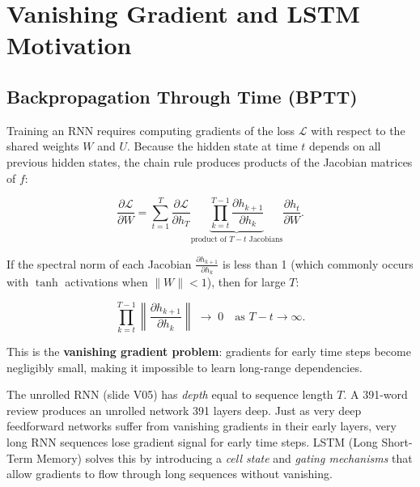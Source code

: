 \documentclass[12pt,a4paper]{article}
\begin{document}
\section{Vanishing Gradient and LSTM Motivation}
\label{sec:lstm_motivation}

\subsection{Backpropagation Through Time (BPTT)}
\label{subsec:bptt}

Training an RNN requires computing gradients of the loss
$\mathcal{L}$ with respect to the shared weights $W$ and $U$.
Because the hidden state at time $t$ depends on all previous hidden
states, the chain rule produces products of the Jacobian matrices of
$f$:

\begin{equation}
  \frac{\partial \mathcal{L}}{\partial W}
    = \sum_{t=1}^{T} \frac{\partial \mathcal{L}}{\partial h_T}
      \underbrace{\prod_{k=t}^{T-1}
        \frac{\partial h_{k+1}}{\partial h_k}}_{\text{product of }T-t\text{ Jacobians}}
      \frac{\partial h_t}{\partial W}.
  \label{eq:bptt}
\end{equation}

If the spectral norm of each Jacobian $\tfrac{\partial h_{k+1}}{\partial h_k}$
is less than 1 (which commonly occurs with $\tanh$ activations when
$\|W\| < 1$), then for large $T$:

\begin{equation}
  \prod_{k=t}^{T-1} \left\| \frac{\partial h_{k+1}}{\partial h_k} \right\|
  \;\longrightarrow\; 0 \quad \text{as } T - t \to \infty.
  \label{eq:vanishing}
\end{equation}

This is the \textbf{vanishing gradient problem}: gradients for early
time steps become negligibly small, making it impossible to learn
long-range dependencies.

\begin{keyinsight}[title=Unrolled View Explains Vanishing Gradients]
  The unrolled RNN (slide V05) has \emph{depth} equal to sequence
  length $T$.  A 391-word review produces an unrolled network 391
  layers deep.  Just as very deep feedforward networks suffer from
  vanishing gradients in their early layers, very long RNN sequences
  lose gradient signal for early time steps.  LSTM (Long Short-Term
  Memory) solves this by introducing a \emph{cell state} and
  \emph{gating mechanisms} that allow gradients to flow through long
  sequences without vanishing.
\end{keyinsight}
\end{document}
